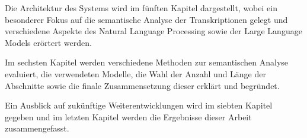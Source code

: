 Die Architektur des Systems wird im fünften Kapitel dargestellt, wobei ein besonderer Fokus auf die semantische Analyse der Transkriptionen gelegt und verschiedene Aspekte des Natural Language Processing sowie der Large Language Models erörtert werden.

Im sechsten Kapitel werden verschiedene Methoden zur semantischen Analyse evaluiert, die verwendeten Modelle, die Wahl der Anzahl und Länge der Abschnitte sowie die finale Zusammensetzung dieser erklärt und begründet.

Ein Ausblick auf zukünftige Weiterentwicklungen wird im siebten Kapitel gegeben und im letzten Kapitel werden die Ergebnisse dieser Arbeit zusammengefasst.

